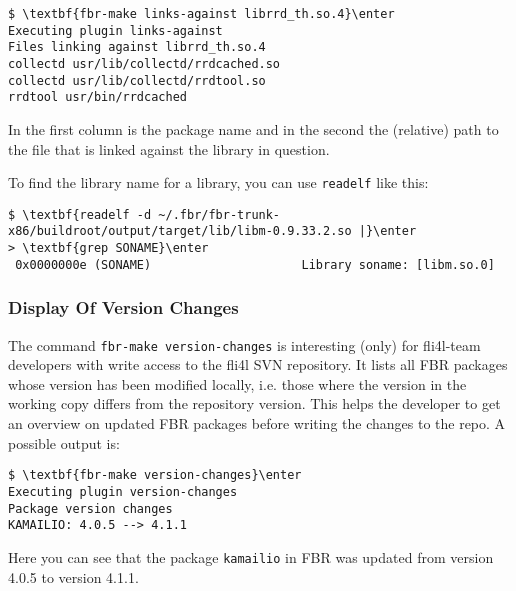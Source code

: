\begin{example}
\begin{Verbatim}[commandchars=\\\{\}]
$ \textbf{fbr-make links-against librrd_th.so.4}\enter
Executing plugin links-against
Files linking against librrd_th.so.4
collectd usr/lib/collectd/rrdcached.so
collectd usr/lib/collectd/rrdtool.so
rrdtool usr/bin/rrdcached
\end{Verbatim}
\end{example}

In the first column is the package name and in the second the (relative)
path to the file that is linked against the library in question.

To find the library name for a library, you can use
\texttt{readelf} like this:

\begin{example}
\begin{Verbatim}[commandchars=\\\{\}]
$ \textbf{readelf -d ~/.fbr/fbr-trunk-x86/buildroot/output/target/lib/libm-0.9.33.2.so |}\enter
> \textbf{grep SONAME}\enter
 0x0000000e (SONAME)                     Library soname: [libm.so.0]
\end{Verbatim}
\end{example}

\subsubsection{Display Of Version Changes}

The command \texttt{fbr-make version-changes} is interesting (only) for fli4l-team developers
with write access to the fli4l SVN repository. It lists all FBR packages whose version has been
modified locally, i.e. those where the version in the working copy differs from the repository
version. This helps the developer to get an overview on updated FBR packages before writing
the changes to the repo. A possible output is:

\begin{example}
\begin{Verbatim}[commandchars=\\\{\}]
$ \textbf{fbr-make version-changes}\enter
Executing plugin version-changes
Package version changes
KAMAILIO: 4.0.5 --> 4.1.1
\end{Verbatim}
\end{example}

Here you can see that the package \texttt{kamailio} in FBR was updated from version
4.0.5 to version 4.1.1.

